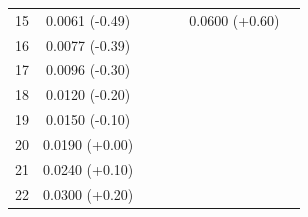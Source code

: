 \documentclass[]{article}
\begin{document}
\begin{table}
\begin{center}
\begin{tabular}{ccccccc}
15 & 0.0061  (-0.49) &  & & & 0.0600 (+0.60) &\\
16 & 0.0077  (-0.39) &  &\\
17 & 0.0096  (-0.30) &  &\\
18 & 0.0120  (-0.20) &  &\\
19 & 0.0150  (-0.10) &  &\\
20 & 0.0190  (+0.00) & & \\
21 & 0.0240  (+0.10) & & \\
22 & 0.0300  (+0.20) & & \\
\hline
\end{tabular}
\end{center}
\end{table}


\end{document}
